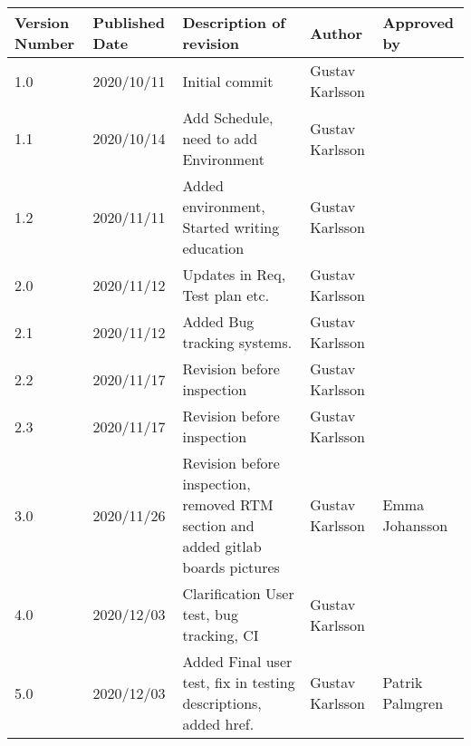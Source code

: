 \begin{tabular}{ |p{3cm}|p{3cm}|p{3cm}|p{3cm}|p{3cm}|  }
 

 \hline
 Version Number & Published Date & Description of revision & Author & Approved by \\
 \hline
 1.0   & 2020/10/11  & Initial commit & Gustav Karlsson & \\
 

 \hline
 1.1   & 2020/10/14   & Add Schedule, need to add Environment & Gustav Karlsson & \\
 
 \hline
 1.2   & 2020/11/11  & Added environment, Started writing education & Gustav Karlsson & \\
 
 \hline
 2.0   & 2020/11/12  & Updates in Req, Test plan etc. &Gustav Karlsson & \\
 
 \hline
 2.1   & 2020/11/12  & Added Bug tracking systems. &Gustav Karlsson & \\
  \hline
 2.2   & 2020/11/17  & Revision before inspection  &Gustav Karlsson & \\
 
 \hline
 2.3   & 2020/11/17  & Revision before inspection &Gustav Karlsson & \\
 
 \hline
  3.0   & 2020/11/26  & Revision before inspection, removed RTM section and added gitlab boards pictures &Gustav Karlsson & Emma Johansson\\
 
 \hline
   4.0   & 2020/12/03  & Clarification User test, bug tracking, CI &Gustav Karlsson & \\
  \hline
   5.0   & 2020/12/03  & Added Final user test, fix in testing descriptions, added href. &Gustav Karlsson & Patrik Palmgren\\
\hline
\end{tabular}